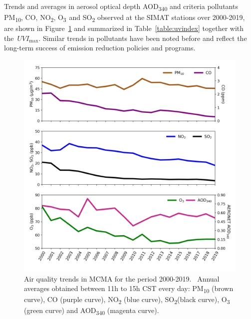 \documentclass[journal=jacsat,manuscript=article]{achemso}
\begin{document}
Trends and averages in aerosol optical depth AOD\textsubscript{340} and
criteria pollutants PM\textsubscript{10}, CO, NO\textsubscript{2},
O\textsubscript{3~}and SO\textsubscript{2} observed at the SIMAT
stations over 2000-2019, are shown in
Figure~{\ref{829996}} and summarized in
Table~{\ref{table:uvindex}} together with
the~\(UVI_{\max}\). Similar trends in pollutants have been noted
before\citep{Parrish_2011,aire_cmdx_2017,Molina_2019}
and reflect the long-term success of
emission reduction policies and programs.

\begin{figure}[H]
  \begin{center}
    \includegraphics[width=0.55\columnwidth]{figures/pollutants}
    \caption{{Air quality trends in MCMA for the period 2000-2019.~ Annual
    averages obtained between 11h to 15h CST every day: PM\textsubscript{10}
    (brown curve), CO (purple curve), NO\textsubscript{2} (blue curve),
    SO\textsubscript{2}(black curve), O\textsubscript{3} (green curve) and
    AOD\textsubscript{340} (magenta curve).
    {\label{829996}}%
    }}
  \end{center}
\end{figure}
\end{document}
